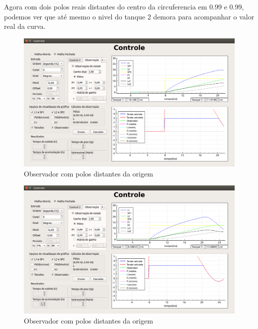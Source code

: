 \documentclass[a4paper,12pt]{article}
\begin{document}
\newpage
\hspace{4ex} Agora  com dois polos reais distantes do centro da circuferencia em 0.99 e 0.99, podemos ver que até mesmo o nivel do tanque 2 demora para acompanhar o valor real da curva.
\begin{figure}[!h]
\centering
\includegraphics[width=14cm]{FotosObservador/PolosMuitoLentos1}
\caption{Observador com polos distantes da origem}
\label{img5}
\end{figure}
\begin{figure}[!h]
\centering
\includegraphics[width=14cm]{FotosObservador/PolosMuitoLentos2}
\caption{Observador com polos distantes da origem}
\label{img6}
\end{figure}
\end{document}
